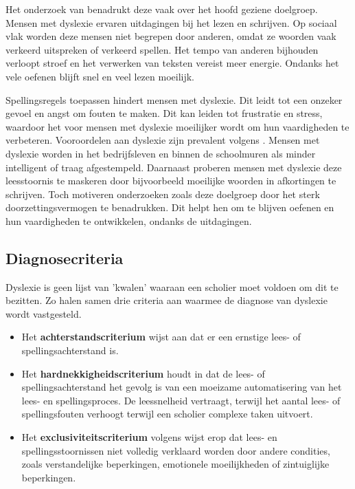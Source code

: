Het onderzoek van \textcite{Lissens2020} benadrukt deze vaak over het hoofd geziene doelgroep. Mensen met dyslexie ervaren uitdagingen bij het lezen en schrijven. Op sociaal vlak worden deze mensen niet begrepen door anderen, omdat ze woorden vaak verkeerd uitspreken of verkeerd spellen. Het tempo van anderen bijhouden verloopt stroef en het verwerken van teksten vereist meer energie. Ondanks het vele oefenen blijft snel en veel lezen moeilijk. 

Spellingsregels toepassen hindert mensen met dyslexie. Dit leidt tot een onzeker gevoel en angst om fouten te maken. Dit kan leiden tot frustratie en stress, waardoor het voor mensen met dyslexie moeilijker wordt om hun vaardigheden te verbeteren. Vooroordelen aan dyslexie zijn prevalent volgens \textcite{Diels2022}. Mensen met dyslexie worden in het bedrijfsleven en binnen de schoolmuren als minder intelligent of traag afgestempeld. Daarnaast proberen mensen met dyslexie deze leesstoornis te maskeren door bijvoorbeeld moeilijke woorden in afkortingen te schrijven. Toch motiveren onderzoeken zoals \textcite{Ghesquiere2018, Lissens2020, Bonte2020} deze doelgroep door het sterk doorzettingsvermogen te benadrukken. Dit helpt hen om te blijven oefenen en hun vaardigheden te ontwikkelen, ondanks de uitdagingen.

\subsection{Diagnosecriteria}

Dyslexie is geen lijst van 'kwalen' waaraan een scholier moet voldoen om dit te bezitten. Zo halen \textcite{Kleijnen2008, Ghesquiere2018} samen drie criteria aan waarmee de diagnose van dyslexie wordt vastgesteld.

\begin{itemize}
	\item Het \textbf{achterstandscriterium} wijst aan dat er een ernstige lees- of spellingsachterstand is. 
	\item Het \textbf{hardnekkigheidscriterium} houdt in dat de lees- of spellingsachterstand het gevolg is van een moeizame automatisering van het lees- en spellingsproces. De leessnelheid vertraagt, terwijl het aantal lees- of spellingsfouten verhoogt terwijl een scholier complexe taken uitvoert.
	\item Het \textbf{exclusiviteitscriterium} volgens \textcite{Ghesquiere2018} wijst erop dat lees- en spellingsstoornissen niet volledig verklaard worden door andere condities, zoals verstandelijke beperkingen, emotionele moeilijkheden of zintuiglijke beperkingen.
\end{itemize}

